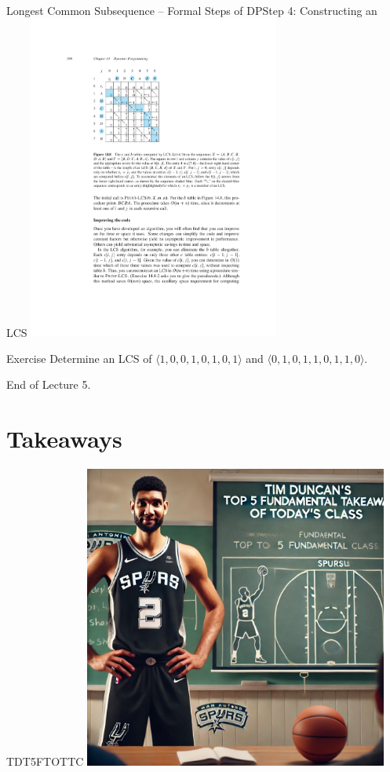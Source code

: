 \documentclass[aspectratio=169]{beamer}
\begin{document}
\begin{frame}{Longest Common Subsequence -- Formal Steps of DP}{Step 4: Constructing an LCS}
    \centering
    \includegraphics[width=0.62\textwidth,clip,trim=5.53cm 13cm 3.27cm 4cm]{figures/p398}
\end{frame}

\begin{frame}{Exercise}
    \Large
    Determine an LCS of $\langle1, 0, 0, 1, 0, 1, 0, 1\rangle$ and $\langle0, 1, 0, 1, 1, 0, 1, 1, 0\rangle$.
\end{frame}

\begin{frame}{}
    \centering
    \Huge End of Lecture 5.
\end{frame}

\section*{Takeaways}

\begin{frame}{TDT5FTOTTC}
    \centering
    \includegraphics[width=0.75\textwidth]{figures/tim.png}
\end{frame}
\end{document}
